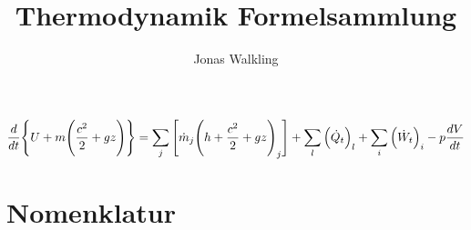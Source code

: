 \documentclass[twocolumn]{article}
\title{Thermodynamik Formelsammlung}
\author{Jonas Walkling}
\begin{document}
\newcommand{\thicc}{thick}

\onecolumn
\maketitle
\pagebreak
\tableofcontents
\twocolumn
\pagebreak

\Large
\begin{equation*}
	\frac{d}{dt}\Bigg{\{} U + m \Bigg{(}\frac{c^2}{2}+gz\Bigg{)}\Bigg{\}} 
	= 
	\sum_{j}{\Bigg{[}\dot{m}_j\Bigg{(}h+\frac{c^2}{2}+gz\Bigg{)}_j \Bigg{]}}  
	+ 
	\sum_{l}^{} \Big(\dot{Q}_t\Big)_l 
	+ 
	\sum_{i}\Big(\dot{W}_t\Big)_i
	-
	p\frac{dV}{dt}
\end{equation*}

\normalsize


\section{Nomenklatur}
\end{document}
